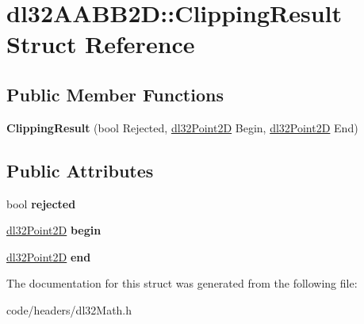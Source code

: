 \hypertarget{structdl32_a_a_b_b2_d_1_1_clipping_result}{\section{dl32\-A\-A\-B\-B2\-D\-:\-:Clipping\-Result Struct Reference}
\label{structdl32_a_a_b_b2_d_1_1_clipping_result}
}
\subsection*{Public Member Functions}
\begin{DoxyCompactItemize}
\item 
\hypertarget{structdl32_a_a_b_b2_d_1_1_clipping_result_a15316afc112b82b93bb2dc33cb4d538b}{{\bfseries Clipping\-Result} (bool Rejected, \hyperlink{structdl32_point2_d}{dl32\-Point2\-D} Begin, \hyperlink{structdl32_point2_d}{dl32\-Point2\-D} End)}\label{structdl32_a_a_b_b2_d_1_1_clipping_result_a15316afc112b82b93bb2dc33cb4d538b}

\end{DoxyCompactItemize}
\subsection*{Public Attributes}
\begin{DoxyCompactItemize}
\item 
\hypertarget{structdl32_a_a_b_b2_d_1_1_clipping_result_ab93b45d5edc365ee7157c641ce57f8a1}{bool {\bfseries rejected}}\label{structdl32_a_a_b_b2_d_1_1_clipping_result_ab93b45d5edc365ee7157c641ce57f8a1}

\item 
\hypertarget{structdl32_a_a_b_b2_d_1_1_clipping_result_a88f999038d4312d616297603fe1ef31d}{\hyperlink{structdl32_point2_d}{dl32\-Point2\-D} {\bfseries begin}}\label{structdl32_a_a_b_b2_d_1_1_clipping_result_a88f999038d4312d616297603fe1ef31d}

\item 
\hypertarget{structdl32_a_a_b_b2_d_1_1_clipping_result_ad05df790e44dd7ff7c3e6194c9fefefb}{\hyperlink{structdl32_point2_d}{dl32\-Point2\-D} {\bfseries end}}\label{structdl32_a_a_b_b2_d_1_1_clipping_result_ad05df790e44dd7ff7c3e6194c9fefefb}

\end{DoxyCompactItemize}


The documentation for this struct was generated from the following file\-:\begin{DoxyCompactItemize}
\item 
code/headers/dl32\-Math.\-h\end{DoxyCompactItemize}
